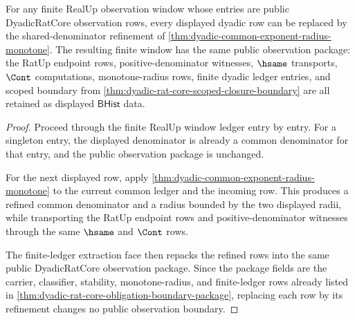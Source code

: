 \begin{theorem}
\label{thm:dyadic-window-denominator-common-refinement}
For any finite RealUp observation window whose entries are public DyadicRatCore
observation rows, every displayed dyadic row can be replaced by the
shared-denominator refinement of
\autoref{thm:dyadic-common-exponent-radius-monotone}. The resulting finite
window has the same public observation package: the RatUp endpoint rows,
positive-denominator witnesses, $\hsame$ transports, $\Cont$ computations,
monotone-radius rows, finite dyadic ledger entries, and scoped boundary from
\autoref{thm:dyadic-rat-core-scoped-closure-boundary} are all retained as
displayed $\mathsf{BHist}$ data.
\end{theorem}
\begin{proof}
Proceed through the finite RealUp window ledger entry by entry. For a singleton
entry, the displayed denominator is already a common denominator for that
entry, and the public observation package is unchanged.

For the next displayed row, apply
\autoref{thm:dyadic-common-exponent-radius-monotone} to the current common
ledger and the incoming row. This produces a refined common denominator and a
radius bounded by the two displayed radii, while transporting the RatUp
endpoint rows and positive-denominator witnesses through the same $\hsame$ and
$\Cont$ rows.

The finite-ledger extraction face then repacks the refined rows into the same
public DyadicRatCore observation package. Since the package fields are the
carrier, classifier, stability, monotone-radius, and finite-ledger rows already
listed in \autoref{thm:dyadic-rat-core-obligation-boundary-package}, replacing
each row by its refinement changes no public observation boundary.
\end{proof}

